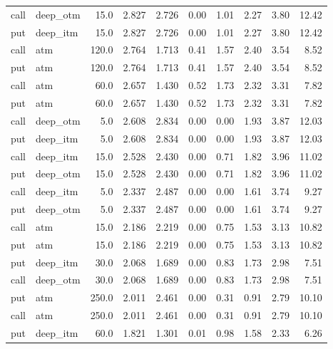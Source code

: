 \begin{longtable}{llrrrrrrrr}
\bottomrule
\endlastfoot
 call &  deep\_otm &      15.0 & 2.827 & 2.726 &    0.00 &    1.01 &   2.27 &    3.80 &   12.42 \\
  put &  deep\_itm &      15.0 & 2.827 & 2.726 &    0.00 &    1.01 &   2.27 &    3.80 &   12.42 \\
 call &       atm &     120.0 & 2.764 & 1.713 &    0.41 &    1.57 &   2.40 &    3.54 &    8.52 \\
  put &       atm &     120.0 & 2.764 & 1.713 &    0.41 &    1.57 &   2.40 &    3.54 &    8.52 \\
 call &       atm &      60.0 & 2.657 & 1.430 &    0.52 &    1.73 &   2.32 &    3.31 &    7.82 \\
  put &       atm &      60.0 & 2.657 & 1.430 &    0.52 &    1.73 &   2.32 &    3.31 &    7.82 \\
 call &  deep\_otm &       5.0 & 2.608 & 2.834 &    0.00 &    0.00 &   1.93 &    3.87 &   12.03 \\
  put &  deep\_itm &       5.0 & 2.608 & 2.834 &    0.00 &    0.00 &   1.93 &    3.87 &   12.03 \\
 call &  deep\_itm &      15.0 & 2.528 & 2.430 &    0.00 &    0.71 &   1.82 &    3.96 &   11.02 \\
  put &  deep\_otm &      15.0 & 2.528 & 2.430 &    0.00 &    0.71 &   1.82 &    3.96 &   11.02 \\
 call &  deep\_itm &       5.0 & 2.337 & 2.487 &    0.00 &    0.00 &   1.61 &    3.74 &    9.27 \\
  put &  deep\_otm &       5.0 & 2.337 & 2.487 &    0.00 &    0.00 &   1.61 &    3.74 &    9.27 \\
 call &       atm &      15.0 & 2.186 & 2.219 &    0.00 &    0.75 &   1.53 &    3.13 &   10.82 \\
  put &       atm &      15.0 & 2.186 & 2.219 &    0.00 &    0.75 &   1.53 &    3.13 &   10.82 \\
  put &  deep\_itm &      30.0 & 2.068 & 1.689 &    0.00 &    0.83 &   1.73 &    2.98 &    7.51 \\
 call &  deep\_otm &      30.0 & 2.068 & 1.689 &    0.00 &    0.83 &   1.73 &    2.98 &    7.51 \\
  put &       atm &     250.0 & 2.011 & 2.461 &    0.00 &    0.31 &   0.91 &    2.79 &   10.10 \\
 call &       atm &     250.0 & 2.011 & 2.461 &    0.00 &    0.31 &   0.91 &    2.79 &   10.10 \\
  put &  deep\_itm &      60.0 & 1.821 & 1.301 &    0.01 &    0.98 &   1.58 &    2.33 &    6.26 \\

\end{longtable}
